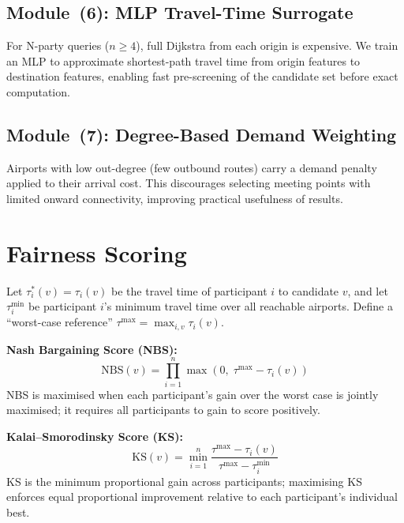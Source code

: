 \documentclass[review]{elsarticle}
\begin{document}
\subsection{Module~(6): MLP Travel-Time Surrogate}

For N-party queries ($n \geq 4$), full Dijkstra from each origin is expensive.
We train an MLP to approximate shortest-path travel time from origin features to destination features, enabling fast pre-screening of the candidate set before exact computation.

\subsection{Module~(7): Degree-Based Demand Weighting}

Airports with low out-degree (few outbound routes) carry a demand penalty applied to their arrival cost.
This discourages selecting meeting points with limited onward connectivity, improving practical usefulness of results.

\section{Fairness Scoring}
\label{sec:fairness}

Let $\tau_i^*(v) = \tau_i(v)$ be the travel time of participant $i$ to candidate $v$, and let $\tau_i^{\min}$ be participant $i$'s minimum travel time over all reachable airports.
Define a ``worst-case reference'' $\tau^{\max} = \max_{i,v} \tau_i(v)$.

\textbf{Nash Bargaining Score (NBS):}
\begin{equation}
    \text{NBS}(v) = \prod_{i=1}^{n} \max\!\left(0,\; \tau^{\max} - \tau_i(v)\right)
\end{equation}
NBS is maximised when each participant's gain over the worst case is jointly maximised; it requires all participants to gain to score positively.

\textbf{Kalai--Smorodinsky Score (KS):}
\begin{equation}
    \text{KS}(v) = \min_{i=1}^{n} \frac{\tau^{\max} - \tau_i(v)}{\tau^{\max} - \tau_i^{\min}}
\end{equation}
KS is the minimum proportional gain across participants; maximising KS enforces equal proportional improvement relative to each participant's individual best.
\end{document}
